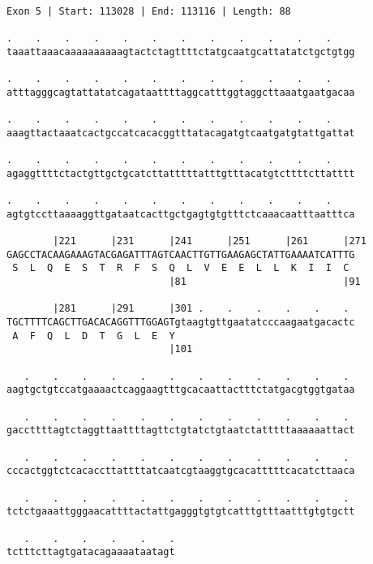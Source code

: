 \documentclass{article}
\begin{document}
\begin{Verbatim}
Exon 5 | Start: 113028 | End: 113116 | Length: 88
 
.    .    .    .    .    .    .    .    .    .    .    .    
taaattaaacaaaaaaaaaagtactctagttttctatgcaatgcattatatctgctgtgg
  
.    .    .    .    .    .    .    .    .    .    .    .    
atttagggcagtattatatcagataattttaggcatttggtaggcttaaatgaatgacaa
  
.    .    .    .    .    .    .    .    .    .    .    .    
aaagttactaaatcactgccatcacacggtttatacagatgtcaatgatgtattgattat
  
.    .    .    .    .    .    .    .    .    .    .    .    
agaggttttctactgttgctgcatcttatttttatttgtttacatgtcttttcttatttt
  
.    .    .    .    .    .    .    .    .    .    .    .    
agtgtccttaaaaggttgataatcacttgctgagtgtgtttctcaaacaatttaatttca
  
        |221      |231      |241      |251      |261      |271
GAGCCTACAAGAAAGTACGAGATTTAGTCAACTTGTTGAAGAGCTATTGAAAATCATTTG
 S  L  Q  E  S  T  R  F  S  Q  L  V  E  E  L  L  K  I  I  C 
                            |81                           |91
  
        |281      |291      |301 .    .    .    .    .    . 
TGCTTTTCAGCTTGACACAGGTTTGGAGTgtaagtgttgaatatcccaagaatgacactc
 A  F  Q  L  D  T  G  L  E  Y                               
                            |101                            
  
   .    .    .    .    .    .    .    .    .    .    .    . 
aagtgctgtccatgaaaactcaggaagtttgcacaattactttctatgacgtggtgataa
  
   .    .    .    .    .    .    .    .    .    .    .    . 
gaccttttagtctaggttaattttagttctgtatctgtaatctatttttaaaaaattact
  
   .    .    .    .    .    .    .    .    .    .    .    . 
cccactggtctcacaccttattttatcaatcgtaaggtgcacatttttcacatcttaaca
  
   .    .    .    .    .    .    .    .    .    .    .    . 
tctctgaaattgggaacattttactattgagggtgtgtcatttgtttaatttgtgtgctt
  
   .    .    .    .    .    .
tctttcttagtgatacagaaaataatagt
\end{Verbatim}
\newpage
\end{document}
